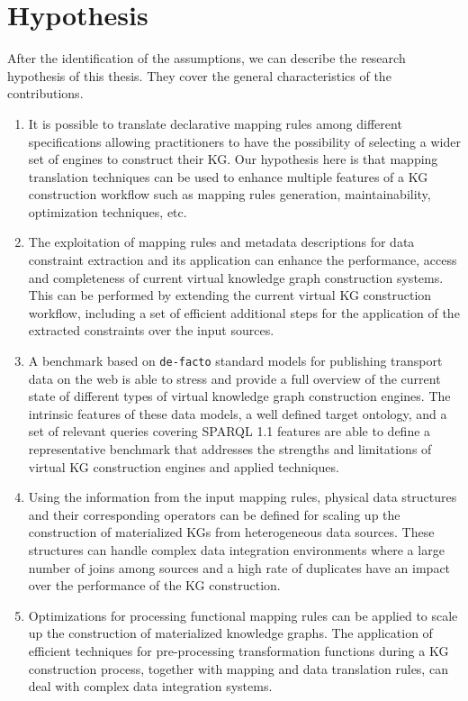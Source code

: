 \section{Hypothesis}
After the identification of the assumptions, we can describe the research hypothesis of this thesis. They cover the general characteristics of the contributions.
\begin{enumerate}[label=\textbf{H{\arabic*}}]
    \item It is possible to translate declarative mapping rules among different specifications allowing practitioners to have the possibility of selecting a wider set of engines to construct their KG. Our hypothesis here is that mapping translation techniques can be used to enhance multiple features of a KG construction workflow such as mapping rules generation, maintainability, optimization techniques, etc.
    \item The exploitation of mapping rules and metadata descriptions for data constraint extraction and its application can enhance the performance, access and completeness of current virtual knowledge graph construction systems. This can be performed by extending the current virtual KG construction workflow, including a set of efficient additional steps for the application of the extracted constraints over the input sources. 
    \item A benchmark based on \texttt{de-facto} standard models for publishing transport data on the web is able to stress and provide a full overview of the current state of different types of virtual knowledge graph construction engines. The intrinsic features of these data models, a well defined target ontology, and a set of relevant queries covering SPARQL 1.1 features are able to define a representative benchmark that addresses the strengths and limitations of virtual KG construction engines and applied techniques.
    \item Using the information from the input mapping rules, physical data structures and their corresponding operators can be defined for scaling up the construction of materialized KGs from heterogeneous data sources. These structures can handle complex data integration environments where a large number of joins among sources and a high rate of duplicates have an impact over the performance of the KG construction. 
    \item Optimizations for processing functional mapping rules can be applied to scale up the construction of materialized knowledge graphs. The application of efficient techniques for pre-processing transformation functions during a KG construction process, together with mapping and data translation rules, can deal with complex data integration systems. 
    
\end{enumerate}

